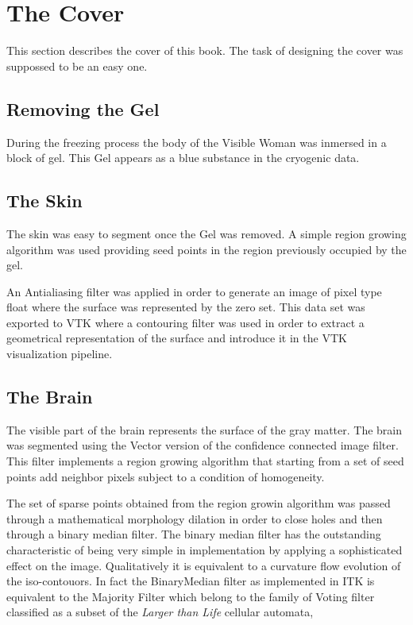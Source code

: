 \chapter{The Cover}

This section describes the cover of this book. The task of designing the cover
was suppossed to be an easy one. 

\section{Removing the Gel}
During the freezing process the body of the Visible Woman was inmersed in a
block of gel. This Gel appears as a blue substance in the cryogenic data.

\section{The Skin}
The skin was easy to segment once the Gel was removed. A simple region growing
algorithm was used providing seed points in the region previously occupied by
the gel. 

An Antialiasing filter was applied in order to generate an image of pixel type
float where the surface was represented by the zero set. This data set was
exported to VTK where a contouring filter was used in order to extract a
geometrical representation of the surface and introduce it in the VTK
visualization pipeline.


\section{The Brain}
The visible part of the brain represents the surface of the gray matter.  The
brain was segmented using the Vector version of the confidence connected image
filter.  This filter implements a region growing algorithm that starting from a
set of seed points add neighbor pixels subject to a condition of homogeneity.

The set of sparse points obtained from the region growin algorithm was passed
through a mathematical morphology dilation in order to close holes and then
through a binary median filter. The binary median filter has the outstanding
characteristic of being very simple in implementation by applying a
sophisticated effect on the image. Qualitatively it is equivalent to a
curvature flow evolution of the iso-contouors. In fact the BinaryMedian filter
as implemented in ITK is equivalent to the Majority Filter which belong to the
family of Voting filter classified as a subset of the \emph{Larger than Life}
cellular automata, 

